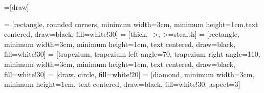 \newcommand{\quotes}[1]{``#1''} %

\usepackage{tikz}
\usetikzlibrary{positioning, shapes.geometric}
=[draw] %

 = [rectangle, rounded corners, minimum width=3cm,
minimum height=1cm,text centered, draw=black, fill=white!30]
 = [thick, ->, >=stealth]
 = [rectangle, minimum width=3cm, minimum height=1cm, text centered, draw=black, fill=white!30]
 = [trapezium, trapezium left angle=70, trapezium right angle=110, minimum width=3cm, minimum height=1cm, text centered, draw=black, fill=white!30]
 = [draw, circle, fill=white!20]
 = [diamond, minimum width=3cm, minimum height=1cm, text centered, draw=black, fill=white!30, aspect=3]


\usepackage{dashbox}
\newcommand\dboxed[1]{\dbox{\ensuremath{#1}}}




\usepackage{fancyhdr}

\setlength{\marginparwidth}{2cm}

\setlength{\headwidth}{\textwidth}

\setlength{\headheight}{15pt} 

\pagestyle{fancy}
\fancyhf{} 

\renewcommand{\sectionmark}[1]{%
	\markboth{\thesection\ #1}{}%
}

\fancyhead[L]{\small \leftmark}

\fancyhead[R]{\small \thepage}

\renewcommand{\headrulewidth}{0.4pt}

\def\figureautorefname{Figura}
\def\tableautorefname{Tabela}
\def\equationautorefname{Equa\c{c}\~ao}


\ifdefined\backref
        \renewcommand*{\backref}[1]{}
        \renewcommand*{\backrefentrycount}[2]{#1\ifnum#2>1 ~(#2)\fi}
\fi

\DeclarePairedDelimiter{\ceil}{\lceil}{\rceil}

\onehalfspacing

\usepackage{pgfgantt}
